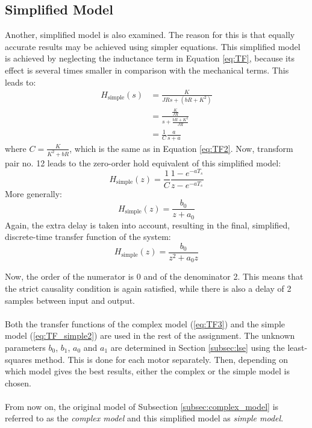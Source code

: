 \documentclass[a4paper,kul]{kulakarticle} %
\begin{document}
\subsection{Simplified Model}
Another, simplified model is also examined. The reason for this is that equally accurate results may be achieved using simpler equations. This simplified model is achieved by neglecting the inductance term in Equation \ref{eq:TF}, because its effect is several times smaller in comparison with the mechanical terms. This leads to:
\begin{equation}
\label{eq:TF_simple}
	\begin{split}
	H_{\text{simple}}(s) &= \frac{K}{JRs + (bR + K^2)} \\
	&= \frac{\frac{K}{JR}}{s + \frac{bR + K^2}{JR}} \\
	&= \frac{1}{C}\frac{a}{s + a}
	\end{split}
\end{equation}
where $C = \frac{K}{K^2 + bR}$, which is the same as in Equation \ref{eq:TF2}. Now, transform pair no. 12 leads to the zero-order hold equivalent of this simplified model:
\begin{equation}
	H_{\text{simple}}(z) = \frac{1}{C}\frac{1-e^{-aT_s}}{z-e^{-aT_s}}
\end{equation}
More generally:
\begin{equation}
	H_{\text{simple}}(z) = \frac{b_0}{z + a_0}
\end{equation}
Again, the extra delay is taken into account, resulting in the final, simplified, discrete-time transfer function of the system:
\begin{equation}
\label{eq:TF_simple2}
	H_{\text{simple}}(z) = \frac{b_0}{z^2 + a_0 z}
\end{equation}

\noindent Now, the order of the numerator is 0 and of the denominator 2. This means that the strict causality condition is again satisfied, while there is also a delay of 2 samples between input and output.
\\\\
Both the transfer functions of the complex model (\ref{eq:TF3}) and the simple model (\ref{eq:TF_simple2}) are used in the rest of the assignment. The unknown parameters $b_0$, $b_1$, $a_0$ and $a_1$ are determined in Section \ref{subsec:lse} using the least-squares method. This is done for each motor separately. Then, depending on which model gives the best results, either the complex or the simple model is chosen.
\\\\
From now on, the original model of Subsection \ref{subsec:complex_model} is referred to as the \textit{complex model} and this simplified model as \textit{simple model}.
\end{document}
